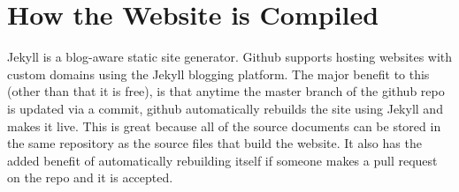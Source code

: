 \section{How the Website is Compiled}

Jekyll is a blog-aware static site generator. Github supports hosting websites with custom domains using the Jekyll blogging platform. The major benefit to this (other than that it is free), is that anytime the master branch of the github repo is updated via a commit, github automatically rebuilds the site using Jekyll and makes it live. This is great because all of the source documents can be stored in the same repository as the source files that build the website. It also has the added benefit of automatically rebuilding itself if someone makes a pull request on the repo and it is accepted.







